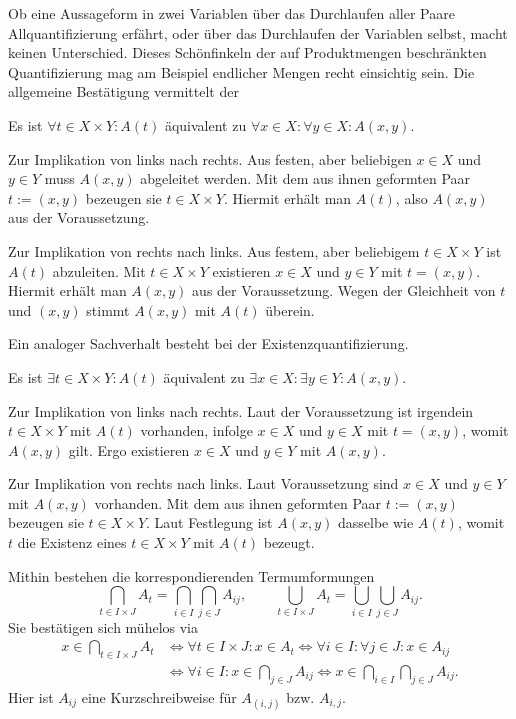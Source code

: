 \noindent
Ob eine Aussageform in zwei Variablen über das Durchlaufen aller Paare
Allquantifizierung erfährt, oder über das Durchlaufen der Variablen
selbst, macht keinen Unterschied. Dieses Schönfinkeln der auf
Produktmengen beschränkten Quantifizierung mag am Beispiel endlicher
Mengen recht einsichtig sein. Die allgemeine Bestätigung vermittelt der

\begin{Satz}
Es ist $\forall t\in X\times Y\colon A(t)$
äquivalent zu $\forall x\in X\colon\forall y\in X\colon A(x,y)$.
\end{Satz}
\begin{Beweis}
Zur Implikation von links nach rechts. Aus festen, aber beliebigen
$x\in X$ und $y\in Y$ muss $A(x,y)$ abgeleitet werden. Mit dem aus ihnen geformten
Paar $t:=(x,y)$ bezeugen sie $t\in X\times Y$. Hiermit erhält man $A(t)$,
also $A(x,y)$ aus der Voraussetzung.

Zur Implikation von rechts nach links. Aus festem, aber beliebigem
$t\in X\times Y$ ist $A(t)$ abzuleiten. Mit $t\in X\times Y$ existieren
$x\in X$ und $y\in Y$ mit $t=(x,y)$. Hiermit erhält man $A(x,y)$ aus
der Voraussetzung. Wegen der Gleichheit von $t$ und $(x,y)$ stimmt
$A(x,y)$ mit $A(t)$ überein.\,\qedsymbol
\end{Beweis}

\noindent
Ein analoger Sachverhalt besteht bei der Existenzquantifizierung.

\begin{Satz}
Es ist $\exists t\in X\times Y\colon A(t)$ äquivalent zu
$\exists x\in X\colon\exists y\in Y\colon A(x,y)$.
\end{Satz}
\begin{Beweis}
Zur Implikation von links nach rechts. Laut der Voraussetzung ist
irgendein $t\in X\times Y$ mit $A(t)$ vorhanden, infolge $x\in X$ und $y\in X$
mit $t=(x,y)$, womit $A(x,y)$ gilt. Ergo existieren $x\in X$ und
$y\in Y$ mit $A(x,y)$.

Zur Implikation von rechts nach links. Laut Voraussetzung sind $x\in X$
und $y\in Y$ mit $A(x,y)$ vorhanden. Mit dem aus ihnen geformten
Paar $t:=(x,y)$ bezeugen sie $t\in X\times Y$. Laut Festlegung ist
$A(x,y)$ dasselbe wie $A(t)$, womit $t$ die Existenz eines
$t\in X\times Y$ mit $A(t)$ bezeugt.\,\qedsymbol
\end{Beweis}

\noindent
Mithin bestehen die korrespondierenden Termumformungen
\[\bigcap_{t\in I\times J} A_t = \bigcap_{i\in I}\bigcap_{j\in J} A_{ij},\qquad
\bigcup_{t\in I\times J} A_t = \bigcup_{i\in I}\bigcup_{j\in J} A_{ij}.\]
Sie bestätigen sich mühelos via
\begin{align*}\textstyle
x\in\bigcap_{t\in I\times J} A_t &\iff
\forall t\in I\times J\colon x\in A_t
\iff\forall i\in I\colon\forall j\in J\colon x\in A_{ij}\\
&\textstyle\iff\forall i\in I\colon x\in\bigcap_{j\in J} A_{ij}
\iff x\in\bigcap_{i\in I}\bigcap_{j\in J} A_{ij}.
\end{align*}
Hier ist $A_{ij}$ eine Kurzschreibweise für $A_{(i,j)}$
bzw. $A_{i,j}$.

